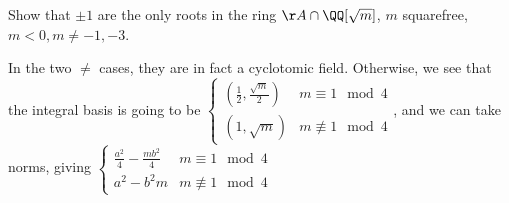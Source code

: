 \begin{problem}
Show that \(\pm 1\) are the only roots in the ring \(\AA \cap \QQ[\sqrt{m}]\), \(m\) squarefree, \(m<0, m \neq -1, -3\).
\end{problem}
In the two \(\neq\) cases, they are in fact a cyclotomic field. Otherwise, we see that the integral basis is going to be \(\begin{cases} \left(\frac{1}{2}, \frac{\sqrt{m}}{2}\right)  & m \equiv 1 \mod 4 \\ (1, \sqrt{m}) & m \not\equiv 1 \mod 4  \end{cases} \), and we can take norms, giving \( \begin{cases} \frac{a^2}{4} -\frac{mb^2}{4} & m \equiv 1 \mod 4 \\ a^2-b^2m & m \not\equiv 1 \mod 4\end{cases} \)